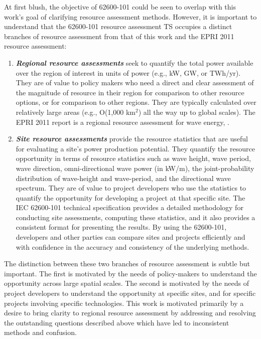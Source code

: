 At first blush, the objective of 62600-101 could be seen to overlap with this work's goal of clarifying resource assessment methods. However, it is important to understand that the 62600-101 resource assessment TS occupies a distinct branches of resource assessment from that of this work and the EPRI 2011 resource assessment:
\begin{enumerate}
\item {\bf \em Regional resource assessments} seek to quantify the total power available over the region of interest in units of power (e.g., kW, GW, or TWh/yr). 
They are of value to policy makers who need a direct and clear assessment of the magnitude of resource in their region for comparison to other resource options, or for comparison to other regions. They are typically calculated over relatively large areas (e.g., O(1,000 km$^2$) all the way up to global scales). The EPRI 2011 report is a regional resource assessment for wave energy, \citep[e.g., ][]{EPRIwaveresource2011,gunnQuantifyingGlobalWave2012,regueroGlobalWavePower2015,motaWaveEnergyPotential2014}. 
\item {\bf \em Site resource assessments} provide the resource statistics that are useful for evaluating a site’s power production potential. They quantify the resource opportunity in terms of resource statistics such as wave height, wave period, wave direction, omni-directional wave power (in kW/m), the joint-probability distribution of wave-height and wave-period, and the directional wave spectrum. They are of value to project developers who use the statistics to quantify the opportunity for developing a project at that specific site. The IEC 62600-101 technical specification provides a detailed methodology for conducting site assessments, computing these statistics, and it also provides a consistent format for presenting the results. By using the 62600-101, developers and other parties can compare sites and projects efficiently and with confidence in the accuracy and consistency of the underlying methods. 
\end{enumerate}

The distinction between these two branches of resource assessment is subtle but important. The first is motivated by the needs of policy-makers to understand the opportunity across large spatial scales. The second is motivated by the needs of project developers to understand the opportunity at specific sites, and for specific projects involving specific technologies. This work is motivated primarily by a desire to bring clarity to regional resource assessment by addressing and resolving the outstanding questions described above which have led to inconsistent methods and confusion. 

